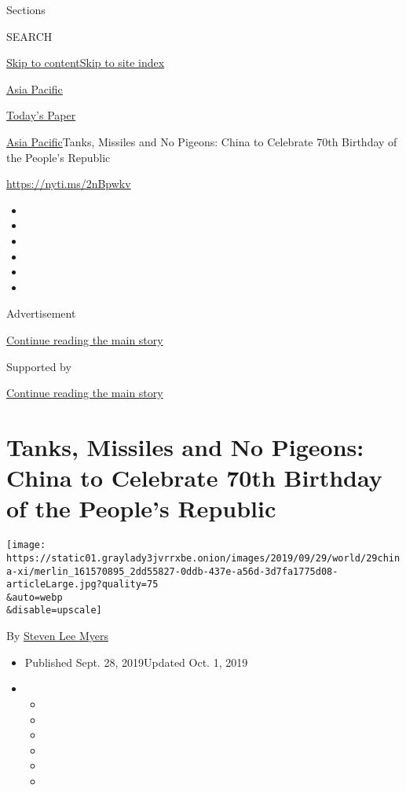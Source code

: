 Sections

SEARCH

\protect\hyperlink{site-content}{Skip to
content}\protect\hyperlink{site-index}{Skip to site index}

\href{https://www.nytimes3xbfgragh.onion/section/world/asia}{Asia
Pacific}

\href{https://myaccount.nytimes3xbfgragh.onion/auth/login?response_type=cookie\&client_id=vi}{}

\href{https://www.nytimes3xbfgragh.onion/section/todayspaper}{Today's
Paper}

\href{/section/world/asia}{Asia Pacific}\textbar{}Tanks, Missiles and No
Pigeons: China to Celebrate 70th Birthday of the People's Republic

\url{https://nyti.ms/2nBpwkv}

\begin{itemize}
\item
\item
\item
\item
\item
\item
\end{itemize}

Advertisement

\protect\hyperlink{after-top}{Continue reading the main story}

Supported by

\protect\hyperlink{after-sponsor}{Continue reading the main story}

\hypertarget{tanks-missiles-and-no-pigeons-china-to-celebrate-70th-birthday-of-the-peoples-republic}{%
\section{Tanks, Missiles and No Pigeons: China to Celebrate 70th
Birthday of the People's
Republic}\label{tanks-missiles-and-no-pigeons-china-to-celebrate-70th-birthday-of-the-peoples-republic}}

\texttt{[image: https://static01.graylady3jvrrxbe.onion/images/2019/09/29/world/29china-xi/merlin\_161570895\_2dd55827-0ddb-437e-a56d-3d7fa1775d08-articleLarge.jpg?quality=75\\\&auto=webp\\\&disable=upscale]}

By \href{https://www.nytimes3xbfgragh.onion/by/steven-lee-myers}{Steven
Lee Myers}

\begin{itemize}
\item
  Published Sept. 28, 2019Updated Oct. 1, 2019
\item
  \begin{itemize}
  \item
  \item
  \item
  \item
  \item
  \item
  \end{itemize}
\end{itemize}

